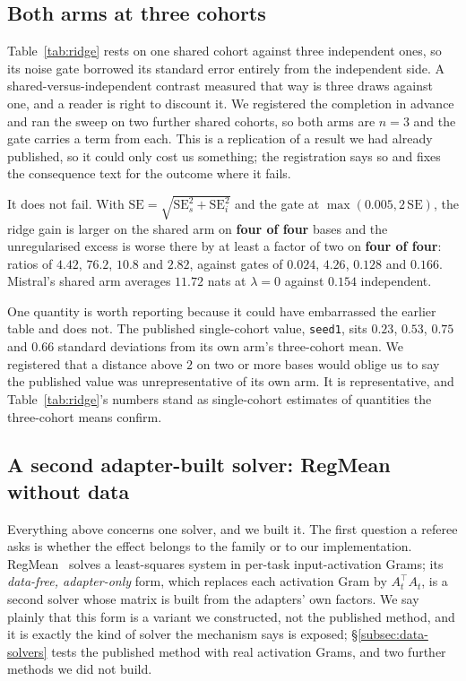 \subsection{Both arms at three cohorts}
\label{subsec:shared-arm}

Table~\ref{tab:ridge} rests on one shared cohort against three independent
ones, so its noise gate borrowed its standard error entirely from the
independent side. A shared-versus-independent contrast measured that way is
three draws against one, and a reader is right to discount it. We registered
the completion in advance and ran the sweep on two further shared cohorts, so
both arms are $n = 3$ and the gate carries a term from each. This is a
replication of a result we had already published, so it could only cost us
something; the registration says so and fixes the consequence text for the
outcome where it fails.

It does not fail. With
$\mathrm{SE} = \sqrt{\mathrm{SE}_s^2 + \mathrm{SE}_i^2}$ and the gate at
$\max(0.005, 2\,\mathrm{SE})$, the ridge gain is larger on the shared arm on
\textbf{four of four} bases and the unregularised excess is worse there by at
least a factor of two on \textbf{four of four}: ratios of $4.42$, $76.2$,
$10.8$ and $2.82$, against gates of $0.024$, $4.26$, $0.128$ and $0.166$.
Mistral's shared arm averages $11.72$ nats at $\lambda = 0$ against $0.154$
independent.

One quantity is worth reporting because it could have embarrassed the earlier
table and does not. The published single-cohort value, \texttt{seed1}, sits
$0.23$, $0.53$, $0.75$ and $0.66$ standard deviations from its own arm's
three-cohort mean. We registered that a distance above $2$ on two or more
bases would oblige us to say the published value was unrepresentative of its
own arm. It is representative, and Table~\ref{tab:ridge}'s numbers stand as
single-cohort estimates of quantities the three-cohort means confirm.

\subsection{A second adapter-built solver: RegMean without data}
\label{subsec:regmean}

Everything above concerns one solver, and we built it. The first question a
referee asks is whether the effect belongs to the family or to our
implementation. RegMean~\citep{jin2023regmean} solves a least-squares system in
per-task input-activation Grams; its \emph{data-free, adapter-only} form, which
replaces each activation Gram by $A_t^\top A_t$, is a second solver whose
matrix is built from the adapters' own factors. We say plainly that this form
is a variant we constructed, not the published method, and it is exactly the
kind of solver the mechanism says is exposed; \S\ref{subsec:data-solvers}
tests the published method with real activation Grams, and two further
methods we did not build.

